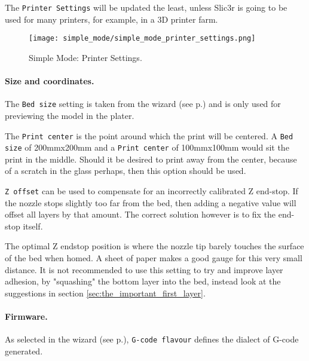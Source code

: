 The \texttt{Printer Settings} will be updated the least, unless Slic3r is going to be used for many printers, for example, in a 3D printer farm.

\begin{figure}[H]
\centering
\texttt{[image: simple\_mode/simple\_mode\_printer\_settings.png]}
\caption{Simple Mode: Printer Settings.}
\label{fig:simple_mode_printer_settings}
\end{figure}

\paragraph{Size and coordinates.} %
\label{par:size_and_coordinates}
The \texttt{Bed size} setting is taken from the wizard (see p.\pageref{sub:2_bed_size}) and is only used for previewing the model in the plater.

The \texttt{Print center} is the point around which the print will be centered.  A \texttt{Bed size} of 200mmx200mm and a \texttt{Print center} of 100mmx100mm would sit the print in the middle.  Should it be desired to print away from the center, because of a scratch in the glass perhaps, then this option should be used.

\texttt{Z offset} can be used to compensate for an incorrectly calibrated Z end-stop.  If the nozzle stops slightly too far from the bed, then adding a negative value will offset all layers by that amount.  The correct solution however is to fix the end-stop itself.

The optimal Z endstop position is where the nozzle tip barely touches the surface of the bed when homed.  A sheet of paper makes a good gauge for this very small distance.  It is not recommended to use this setting to try and improve layer adhesion, by "squashing" the bottom layer into the bed, instead look at the suggestions in section \ref{sec:the_important_first_layer}.

\paragraph{Firmware.} %
\label{par:firmware}
As selected in the wizard (see p.\pageref{sub:1_firmware_type}), \texttt{G-code flavour} defines the dialect of G-code generated.


